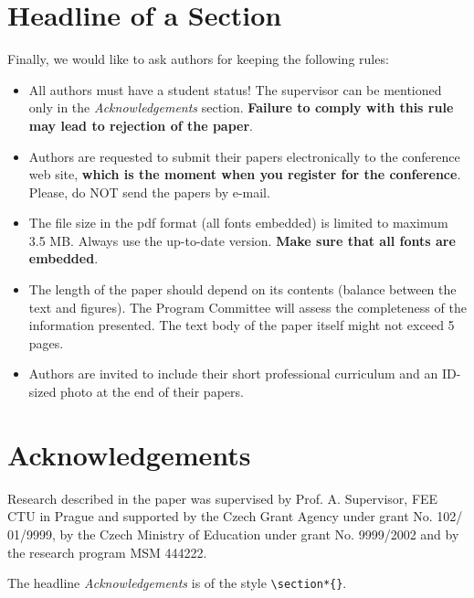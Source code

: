 \documentclass{poster15}
\begin{document}
\section{Headline of a Section}
Finally, we would like to ask authors for keeping the following rules:
\begin{itemize}
\item All authors must have a student status! The supervisor can be mentioned only in the \emph{Acknowledgements} section. \textbf{Failure to comply with this rule may lead to rejection of the paper}.

\item Authors are requested to submit their papers electronically to the conference web site, \textbf{which is the moment when you register for the conference}. Please, do NOT send the papers by e-mail. 

\item The file size in the pdf format (all fonts embedded) is limited to maximum 3.5 MB. Always use the up-to-date version. \textbf{Make sure that all fonts are embedded}. 

\item The length of the paper should depend on its contents (balance between the text and figures). The Program Committee will assess the completeness of the information presented. The text body of the paper itself might not exceed 5 pages. 

\item Authors are invited to include their short professional curriculum and an ID-sized photo at the end of their papers.
\end{itemize}

\section*{Acknowledgements}
Research described in the paper was supervised by Prof. A. Supervisor, FEE CTU in Prague and supported by the Czech Grant Agency under grant No. 102/ 01/9999, by the Czech Ministry of Education under grant No. 9999/2002 and by the research program MSM 444222.

The headline \emph{Acknowledgements} is of the  style \verb+\section*{}+.
\end{document}
